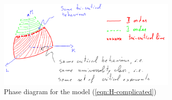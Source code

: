 \documentclass[../../main.tex]{subfiles}
\begin{document}
\begin{figure}[H]
    \centering
    \includegraphics[width=0.8\textwidth]{complicated-phases.png}
    \caption{Phase diagram for the model (\ref{eqn:H-complicated})}
    \label{fig:complicated-phases}
\end{figure}

 
\end{document}

